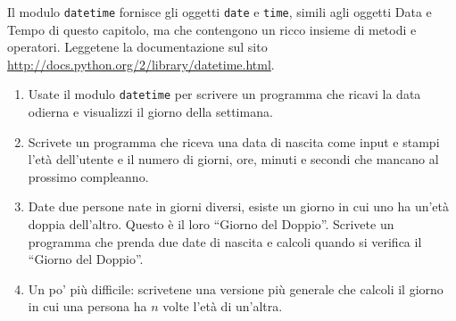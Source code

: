 \documentclass[10pt]{book}
\begin{document}



\vspace{0.2in}
\begin{exercise}

Il modulo {\tt datetime} fornisce gli oggetti {\tt date} e {\tt time}, simili agli oggetti Data e Tempo di questo capitolo, ma che contengono un ricco insieme di metodi e operatori. Leggetene la documentazione sul sito \url{http://docs.python.org/2/library/datetime.html}.

\begin{enumerate}

\item Usate il modulo {\tt datetime} per scrivere un programma che ricavi la data odierna e visualizzi il giorno della settimana.

\item Scrivete un programma che riceva una data di nascita come input e stampi l'età dell'utente e il numero di giorni, ore, minuti e secondi che mancano al prossimo compleanno.

\item Date due persone nate in giorni diversi, esiste un giorno in cui uno ha un'età doppia dell'altro. Questo è il loro ``Giorno del Doppio''. Scrivete un programma che prenda due date di nascita e calcoli quando si verifica il ``Giorno del Doppio''.

\item Un po' più difficile: scrivetene una versione più generale che calcoli il giorno in cui una persona ha $n$ volte l'età di un'altra.

\end{enumerate}

\end{exercise}
\end{document}

